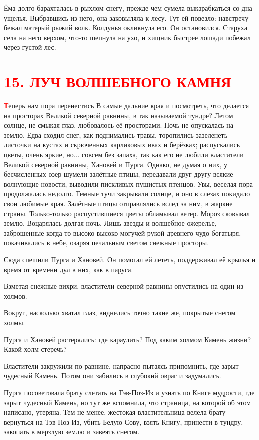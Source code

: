 \documentclass[oneside,final,14pt]{extreport}
\begin{document}
	Ёма долго барахталась в рыхлом снегу, прежде чем сумела выкарабкаться со дна ущелья. Выбравшись из него, она заковыляла к лесу. Тут ей повезло: навстречу бежал матерый рыжий волк. Колдунья окликнула его. Он остановился. Старуха села на него верхом, что-то шепнула на ухо, и хищник быстрее лошади побежал через густой лес.
	
				\section[15. Луч волшебного камня]{\center \textcolor{red}{15. ЛУЧ ВОЛШЕБНОГО КАМНЯ}}
	

	\lettrine[findent=0pt]{\textbf{\textcolor{red}{Т}}}{}еперь нам пора перенестись В самые дальние края и посмотреть, что делается на просторах Великой северной равнины, в так называемой тундре? Летом солнце, не смыкая глаз, любовалось её просторами. Ночь не опускалась на землю. Едва сходил снег, как поднимались травы, торопились зазеленеть листочки на кустах и скрюченных карликовых ивах и берёзках; распускались цветы, очень яркие, но... совсем без запаха, так как его не любили властители Великой северной равнины, Хановей и Пурга. Однако, не думая о них, у бесчисленных озер шумели залётные птицы, передавали друг другу всякие волнующие новости, выводили пискливых пушистых птенцов. Увы, веселая пора продолжалась недолго. Темные тучи закрывали солнце, и оно в слезах покидало свои любимые края. Залётные птицы отправлялись вслед за ним, в жаркие страны. Только-только распустившиеся цветы обламывал ветер. Мороз сковывал землю. Воцарялась долгая ночь. Лишь звезды и волшебное ожерелье, заброшенные когда-то высоко-высоко могучей рукой древнего чудо-богатыря, покачивались в небе, озаряя печальным светом снежные просторы.
	
	Сюда спешили Пурга и Хановей. Он помогал ей лететь, поддерживал её крылья и время от времени дул в них, как в паруса.
	
	Взметая снежные вихри, властители северной равнины опустились на один из холмов.
	
	Вокруг, насколько хватал глаз, виднелись точно такие же, покрытые снегом холмы.
	
	Пурга и Хановей растерялись: где караулить? Под каким холмом Камень жизни? Какой холм стеречь?
	
	Властители закружили по равнине, напрасно пытаясь припомнить, где зарыт чудесный Камень. Потом они забились в глубокий овраг и задумались.
	
	Пурга посоветовала брату слетать на Тэв-Поз-Из и узнать по Книге мудрости, где зарыт чудесный Камень, но тут же вспомнила, что страница, на которой об этом написано, утеряна. Тем не менее, жестокая властительница велела брату вернуться на Тэв-Поз-Из, убить Белую Сову, взять Книгу, принести в тундру, закопать в мерзлую землю и завеять снегом.
	
\end{document}
